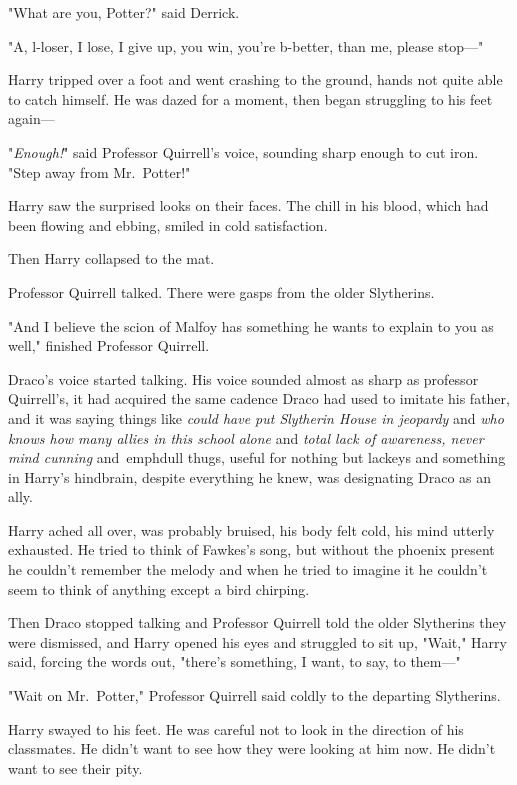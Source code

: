 "What are you, Potter?" said Derrick.

"A, l-loser, I lose, I give up, you win, you're b-better, than me, please 
stop---"

Harry tripped over a foot and went crashing to the ground, hands not quite able 
to catch himself. He was dazed for a moment, then began struggling to his feet 
again---

"\emph{Enough!}" said Professor Quirrell's voice, sounding sharp enough to cut 
iron. "Step away from Mr.~Potter!"

Harry saw the surprised looks on their faces. The chill in his blood, which had 
been flowing and ebbing, smiled in cold satisfaction.

Then Harry collapsed to the mat.

Professor Quirrell talked. There were gasps from the older Slytherins.

"And I believe the scion of Malfoy has something he wants to explain to you as 
well," finished Professor Quirrell.

Draco's voice started talking. His voice sounded almost as sharp as professor 
Quirrell's, it had acquired the same cadence Draco had used to imitate his 
father, and it was saying things like \emph{could have put Slytherin House in 
jeopardy} and \emph{who knows how many allies in this school alone} and 
\emph{total lack of awareness, never mind cunning} and\ emph{dull thugs, useful 
for nothing but lackeys} and something in Harry's hindbrain, despite everything 
he knew, was designating Draco as an ally.

Harry ached all over, was probably bruised, his body felt cold, his mind 
utterly exhausted. He tried to think of Fawkes's song, but without the phoenix 
present he couldn't remember the melody and when he tried to imagine it he 
couldn't seem to think of anything except a bird chirping.

Then Draco stopped talking and Professor Quirrell told the older Slytherins 
they were dismissed, and Harry opened his eyes and struggled to sit up, "Wait," 
Harry said, forcing the words out, "there's something, I want, to say, to 
them---"

"Wait on Mr.~Potter," Professor Quirrell said coldly to the departing 
Slytherins.

Harry swayed to his feet. He was careful not to look in the direction of his 
classmates. He didn't want to see how they were looking at him now. He didn't 
want to see their pity.

